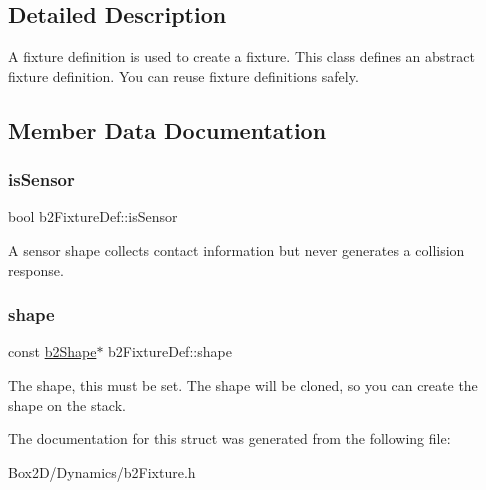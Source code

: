 \subsection{Detailed Description}
A fixture definition is used to create a fixture. This class defines an abstract fixture definition. You can reuse fixture definitions safely. 

\subsection{Member Data Documentation}
\mbox{\label{structb2_fixture_def_ac8cfcc6208663c92861eaab3b3fdc57e}} 
\subsubsection{\texorpdfstring{is\+Sensor}{isSensor}}
{\footnotesize\ttfamily bool b2\+Fixture\+Def\+::is\+Sensor}

A sensor shape collects contact information but never generates a collision response. \mbox{\label{structb2_fixture_def_a1e41753d89abf3443e7897e2498a3240}} 
\subsubsection{\texorpdfstring{shape}{shape}}
{\footnotesize\ttfamily const \hyperlink{classb2_shape}{b2\+Shape}$\ast$ b2\+Fixture\+Def\+::shape}

The shape, this must be set. The shape will be cloned, so you can create the shape on the stack. 

The documentation for this struct was generated from the following file\+:\begin{DoxyCompactItemize}
\item 
Box2\+D/\+Dynamics/b2\+Fixture.\+h\end{DoxyCompactItemize}
